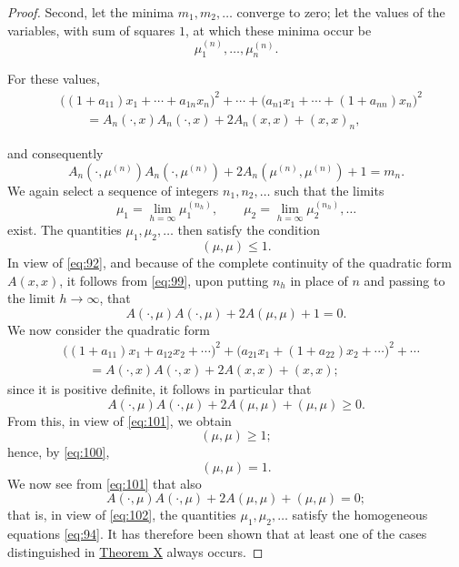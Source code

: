 \documentclass[b5paper,twoside]{article}
\newcommand{\originalpage}[1]{\phantomsection\label{origpage:#1}}
\begin{document}
\begin{proof}
Second, let the minima $m_1,m_2,\ldots$ converge to zero; let the values of
the variables, with sum of squares $1$, at which these minima occur be
\[
  \mu_1^{(n)},\ldots,\mu_n^{(n)}.
\]
\begin{samepage}
For these values,
\begin{align*}
 &\bigl((1+a_{11})x_1+\cdots+a_{1n}x_n\bigr)^2+\cdots
 +\bigl(a_{n1}x_1+\cdots+(1+a_{nn})x_n\bigr)^2\\
 &\qquad=A_n(\mathord{\cdot},x)A_n(\mathord{\cdot},x)
 +2A_n(x,x)+(x,x)_n,
\end{align*}
\end{samepage}
and consequently
\begin{equation}
  A_n(\mathord{\cdot},\mu^{(n)})A_n(\mathord{\cdot},\mu^{(n)})
  +2A_n(\mu^{(n)},\mu^{(n)})+1=m_n.
  \tag{99}\label{eq:99}
\end{equation}
We again select a sequence of integers $n_1,n_2,\ldots$ such that the limits
\[
  \mu_1=\lim_{h=\infty}\mu_1^{(n_h)},\qquad
  \mu_2=\lim_{h=\infty}\mu_2^{(n_h)},\ldots
\]
exist. The quantities $\mu_1,\mu_2,\ldots$ then satisfy the condition
\begin{equation}
  (\mu,\mu)\leq1.
  \tag{100}\label{eq:100}
\end{equation}
In view of \eqref{eq:92}, and because of the complete continuity of the
quadratic form $A(x,x)$, it follows from \eqref{eq:99}, upon putting $n_h$
in place of $n$ and passing to the limit $h\to\infty$, that
\begin{equation}
  A(\mathord{\cdot},\mu)A(\mathord{\cdot},\mu)
  +2A(\mu,\mu)+1=0.
  \tag{101}\label{eq:101}
\end{equation}
We now consider the quadratic form
\begin{equation}
  \begin{aligned}
   &\bigl((1+a_{11})x_1+a_{12}x_2+\cdots\bigr)^2
   +\bigl(a_{21}x_1+(1+a_{22})x_2+\cdots\bigr)^2+\cdots\\
   &\qquad=A(\mathord{\cdot},x)A(\mathord{\cdot},x)
   +2A(x,x)+(x,x);
  \end{aligned}
  \tag{102}\label{eq:102}
\end{equation}
since it is positive definite, it follows in particular that
\begin{equation}
  A(\mathord{\cdot},\mu)A(\mathord{\cdot},\mu)
  +2A(\mu,\mu)+(\mu,\mu)\geq0.
  \tag{103}\label{eq:103}
\end{equation}
From this, in view of \eqref{eq:101}, we obtain
\[
  (\mu,\mu)\geq1;
\]
\originalpage{222}
hence, by \eqref{eq:100},
\[
  (\mu,\mu)=1.
\]
We now see from \eqref{eq:101} that also
\[
  A(\mathord{\cdot},\mu)A(\mathord{\cdot},\mu)
  +2A(\mu,\mu)+(\mu,\mu)=0;
\]
that is, in view of \eqref{eq:102}, the quantities
$\mu_1,\mu_2,\ldots$ satisfy the homogeneous equations \eqref{eq:94}. It has
therefore been shown that at least one of the cases distinguished in
\hyperref[thm:X]{Theorem X} always occurs.


\end{proof}
\end{document}
